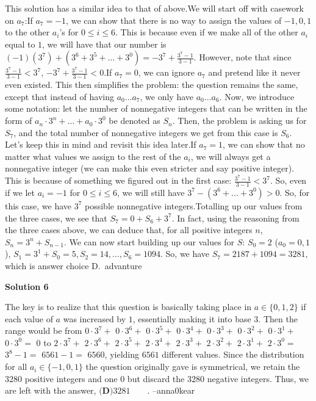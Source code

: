 \begin{enumerate}
This solution has a similar idea to that of above.We will start off with casework on $a_{7}$:If $a_7 = -1$, we can show that there is no way to assign the values of $-1, 0, 1$ to the other $a_{i}$'s for $0 \leq i \leq 6$. This is because even if we make all of the other $a_{i}$ equal to $1$, we will have that our number is $(-1)(3^{7}) + (3^{6}+3^{5}+...+3^{0}) = -3^{7} + \frac{3^{7}-1}{3-1}$. However, note that since $\frac{3^{7}-1}{3-1} < 3^{7}$, $-3^{7} + \frac{3^{7}-1}{3-1} < 0$.If $a_{7}=0$, we can ignore $a_{7}$ and pretend like it never even existed. This then simplifies the problem: the question remains the same, except that instead of having $a_{0}...a_{7}$, we only have $a_{0}...a_{6}$. Now, we introduce some notation: let the number of nonnegative integers that can be written in the form of $a_{n} \cdot 3^{n} + ... + a_{0} \cdot 3^{0}$ be denoted as $S_{n}$. Then, the problem is asking us for $S_{7}$, and the total number of nonnegative integers we get from this case is $S_{6}$. Let's keep this in mind and revisit this idea later.If $a_{7}=1$, we can show that no matter what values we assign to the rest of the $a_{i}$, we will always get a nonnegative integer (we can make this even stricter and say positive integer). This is because of something we figured out in the first case: $\frac{3^{7}-1}{3-1} < 3^{7}$. So, even if we let $a_{i}=-1$ for $0 \leq i \leq 6$, we will still have $3^{7} - (3^{6}+...+3^{0}) > 0$. So, for this case, we have $3^7$ possible nonnegative integers.Totalling up our values from the three cases, we see that $S_{7} = 0 + S_{6} + 3^{7}$. In fact, using the reasoning from the three cases above, we can deduce that, for all positive integers $n$, $S_{n} = 3^{n} + S_{n-1}$. We can now start building up our values for $S$: $S_{0} = 2$ ($a_{0} = 0, 1$), $S_{1} = 3^{1}+S_{0} = 5, S_{2} = 14, ..., S_{6}=1094$. So, we have $S_{7} = 2187 + 1094 = \boxed{3281}$, which is answer choice $\boxed{\text{D}}$.~advanture

 



\textbf{Solution 6}

The key is to realize that this question is basically taking place in $a\in\{0,1,2\}$ if each value of $a$ was increased by $1$, essentially making it into base $3$. Then the range would be from $0\cdot3^7+$ $0\cdot3^6+$ $0\cdot3^5+$ $0\cdot3^4+$ $0\cdot3^3+$ $0\cdot3^2+$ $0\cdot3^1+$ $0\cdot3^0=$ $0$ to $2\cdot3^7+$ $2\cdot3^6+$ $2\cdot3^5+$ $2\cdot3^4+$ $2\cdot3^3+$ $2\cdot3^2+$ $2\cdot3^1+$ $2\cdot3^0=$ $3^8-1=$ $6561-1=$ $6560$, yielding $6561$ different values. Since the distribution for all $a_i\in \{-1,0,1\}$ the question originally gave is symmetrical, we retain the $3280$ positive integers and one $0$ but discard the $3280$ negative integers. Thus, we are left with the answer, $\boxed{\textbf{(D)} 3281}\qquad$.  --anna0kear


\end{enumerate}
